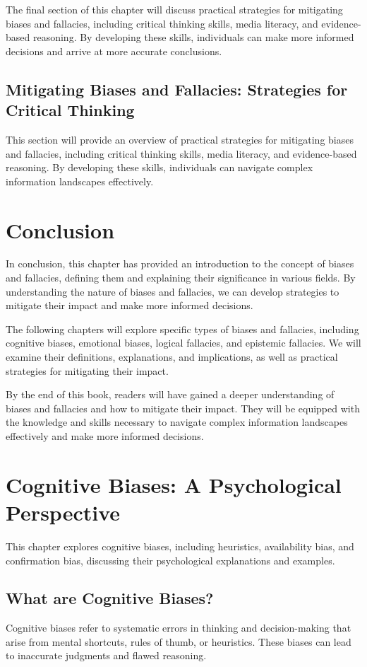 \documentclass{report}%
\begin{document}
{{{{{{{{{{{The final section of this chapter will discuss practical strategies for mitigating biases and fallacies, including critical thinking skills, media literacy, and evidence-based reasoning. By developing these skills, individuals can make more informed decisions and arrive at more accurate conclusions.

\section{Mitigating Biases and Fallacies: Strategies for Critical Thinking}

This section will provide an overview of practical strategies for mitigating biases and fallacies, including critical thinking skills, media literacy, and evidence-based reasoning. By developing these skills, individuals can navigate complex information landscapes effectively.

\chapter{Conclusion}

In conclusion, this chapter has provided an introduction to the concept of biases and fallacies, defining them and explaining their significance in various fields. By understanding the nature of biases and fallacies, we can develop strategies to mitigate their impact and make more informed decisions.

The following chapters will explore specific types of biases and fallacies, including cognitive biases, emotional biases, logical fallacies, and epistemic fallacies. We will examine their definitions, explanations, and implications, as well as practical strategies for mitigating their impact.

By the end of this book, readers will have gained a deeper understanding of biases and fallacies and how to mitigate their impact. They will be equipped with the knowledge and skills necessary to navigate complex information landscapes effectively and make more informed decisions.%
\chapter{Cognitive Biases: A Psychological Perspective}%
This chapter explores cognitive biases, including heuristics, availability bias, and confirmation bias, discussing their psychological explanations and examples.

%
\section{What are Cognitive Biases?}%
Cognitive biases refer to systematic errors in thinking and decision-making that arise from mental shortcuts, rules of thumb, or heuristics. These biases can lead to inaccurate judgments and flawed reasoning.

}}}}}}}}}}}
\end{document}
